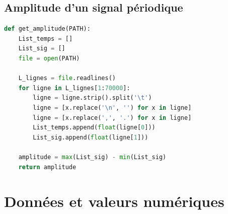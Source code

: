 \documentclass[a4paper,11pt]{article}
\begin{document}
\subsection{Amplitude d'un signal périodique}
\begin{lstlisting}[language=Python]
def get_amplitude(PATH):
    List_temps = []
    List_sig = []
    file = open(PATH)
    
    L_lignes = file.readlines()
    for ligne in L_lignes[1:70000]:
        ligne = ligne.strip().split('\t')
        ligne = [x.replace('\n', '') for x in ligne]
        ligne = [x.replace(',', '.') for x in ligne]
        List_temps.append(float(ligne[0]))
        List_sig.append(float(ligne[1]))
    
    amplitude = max(List_sig) - min(List_sig)
    return amplitude
\end{lstlisting}

\newpage
\section{Données et valeurs numériques}
\end{document}
